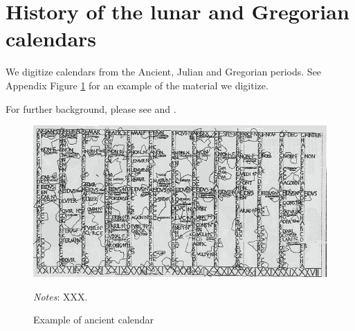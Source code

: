 \documentclass[12pt,pdftex, notitlepage]{article}
\let\footnotesize=\small
\begin{document}
\newpage \clearpage



\section{History of the lunar and Gregorian calendars}\label{app-sec-calendar}




\setcounter{figure}{0}
\renewcommand{\figurename}{Appendix Figure}
\setcounter{table}{0}
\renewcommand{\tablename}{Appendix Table}

\renewcommand{\thetable}{\thesection.\arabic{table}}
\renewcommand{\thefigure}{\thesection.\arabic{figure}}

We digitize calendars from the Ancient, Julian and Gregorian periods.  See Appendix Figure \ref{fig-old-calendar} for an example of the material we digitize.

For further background, please see  \citet{depuydt1997civil} and \citet{mckay2016coligny}.


\begin{figure}[h]
	\caption{Example of ancient calendar} \label{fig-old-calendar}
	\centerline{\includegraphics[width=7in]{figures/old_calendar.png}}
	
\noindent \raggedright	
\footnotesize{\textit{Notes}:  XXX.}
\end{figure}
\end{document}
